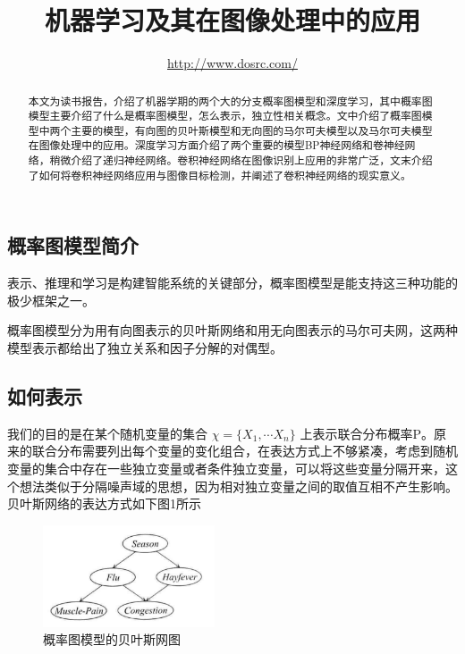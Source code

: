\documentclass{article} %
\title{机器学习及其在图像处理中的应用}
\author{
 \url{http://www.dosrc.com/}
}
\begin{document}
\begin{CJK*}{UTF8}{gkai}

\maketitle

\begin{abstract}
本文为读书报告，介绍了机器学期的两个大的分支概率图模型和深度学习，其中概率图模型主要介绍了什么是概率图模型，怎么表示，独立性相关概念。文中介绍了概率图模型中两个主要的模型，有向图的贝叶斯模型和无向图的马尔可夫模型以及马尔可夫模型在图像处理中的应用。深度学习方面介绍了两个重要的模型BP神经网络和卷神经网络，稍微介绍了递归神经网络。卷积神经网络在图像识别上应用的非常广泛，文末介绍了如何将卷积神经网络应用与图像目标检测，并阐述了卷积神经网络的现实意义。
\end{abstract}

\section{概率图模型简介}
表示、推理和学习是构建智能系统的关键部分，概率图模型是能支持这三种功能的极少框架之一。

概率图模型分为用有向图表示的贝叶斯网络和用无向图表示的马尔可夫网，这两种模型表示都给出了独立关系和因子分解的对偶型。

\subsection*{如何表示}
我们的目的是在某个随机变量的集合 $\chi =\lbrace X _{1},\cdots X _{n} \rbrace$ 上表示联合分布概率P。原来的联合分布需要列出每个变量的变化组合，在表达方式上不够紧凑，考虑到随机变量的集合中存在一些独立变量或者条件独立变量，可以将这些变量分隔开来，这个想法类似于分隔噪声域的思想，因为相对独立变量之间的取值互相不产生影响。贝叶斯网络的表达方式如下图1所示

\begin{figure}[h]
\begin{center}

\includegraphics[width=2in]{1.png}

\end{center}
\caption{概率图模型的贝叶斯网图}
\end{figure}


\end{CJK*}
\end{document}

